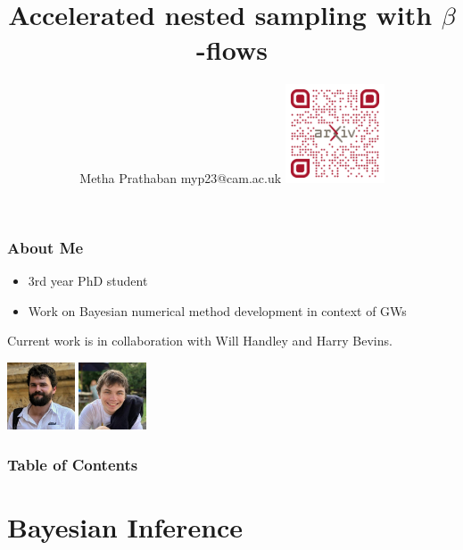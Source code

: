 \documentclass[aspectratio=169, 11pt]{beamer}
\title[Accelerated nested sampling with $\beta$-flows for gravitational waves] %
{Accelerated nested sampling with $\beta$-flows}
\author[Metha Prathaban] %
{Metha Prathaban \break myp23@cam.ac.uk \break \vfill\includegraphics[width=0.22\textwidth]{Ca_Foscari Beamer/qr-code.png}}
\date{}
\def \bblock{\begin{beamerboxesrounded}[upper=uppercolor,lower=lowercolor,shadow=true]}
\def \eblock{\end{beamerboxesrounded}}
\begin{document}
\frame{\titlepage}
\begin{frame}
\frametitle{About Me}
\begin{itemize}
    \item 3rd year PhD student
    \item Work on Bayesian numerical method development in context of GWs
\end{itemize}
\vspace{2em}
\bblock{\begin{center}
Current work is in collaboration with Will Handley and Harry Bevins.
\end{center}}
\begin{center}
\includegraphics[height=2.0cm]{Ca_Foscari Beamer/will_handley.jpg}
\includegraphics[height=2.0cm]{Ca_Foscari Beamer/harry_bevins.jpg}
\end{center}
\eblock
\end{frame}
\begin{frame}
\frametitle{Table of Contents}
\tableofcontents
\end{frame}


\section{Bayesian Inference}



    
\end{document}
